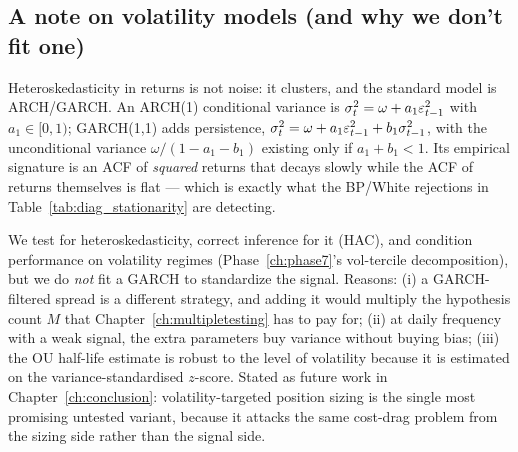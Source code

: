 \subsection{A note on volatility models (and why we don't fit one)}
\label{sec:ts:arch}

Heteroskedasticity in returns is not noise: it clusters, and the standard model is
ARCH/GARCH. An ARCH(1) conditional variance is
$\sigma_t^2 = \omega + a_1\varepsilon_{t-1}^2$ with $a_1\in[0,1)$; GARCH(1,1) adds persistence,
$\sigma_t^2=\omega+a_1\varepsilon_{t-1}^2+b_1\sigma_{t-1}^2$, with the unconditional variance
$\omega/(1-a_1-b_1)$ existing only if $a_1+b_1<1$. Its empirical signature is an ACF of
\emph{squared} returns that decays slowly while the ACF of returns themselves is flat ---
which is exactly what the BP/White rejections in Table~\ref{tab:diag_stationarity} are
detecting.

We test for heteroskedasticity, correct inference for it (HAC), and condition
performance on volatility regimes (Phase~\ref{ch:phase7}'s vol-tercile decomposition),
but we do \emph{not} fit a GARCH to standardize the signal. Reasons: (i) a GARCH-filtered
spread is a different strategy, and adding it would multiply the hypothesis count $M$
that Chapter~\ref{ch:multipletesting} has to pay for; (ii) at daily frequency with a weak
signal, the extra parameters buy variance without buying bias; (iii) the OU half-life
estimate is robust to the level of volatility because it is estimated on the
variance-standardised $z$-score. Stated as future work in Chapter~\ref{ch:conclusion}:
volatility-targeted position sizing is the single most promising untested variant,
because it attacks the same cost-drag problem from the sizing side rather than the
signal side.
